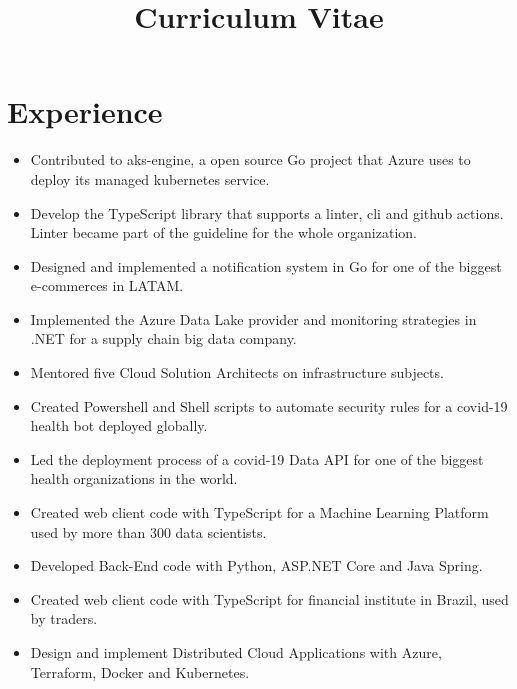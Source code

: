 \documentclass[10pt, a4paper, roman]{moderncv} %
\title{Curriculum Vitae}
\begin{document}
\makecvtitle %

\section{Experience}
{
    \begin{itemize}
	    \item Contributed to aks-engine, a open source Go project that Azure uses to deploy its managed kubernetes service. 
	    \item Develop the TypeScript library that supports a linter, cli and github actions. Linter became part of the guideline for the whole organization.
        \item Designed and implemented a notification system in Go for one of the biggest e-commerces in LATAM.
        \item Implemented the Azure Data Lake provider and monitoring strategies in .NET for a supply chain big data company.
        \item Mentored five Cloud Solution Architects on infrastructure subjects.
        \item Created Powershell and Shell scripts to automate security rules for a covid-19 health bot deployed globally.
        \item Led the deployment process of a covid-19 Data API for one of the biggest health organizations in the world.
    \end{itemize}
}


{
    \begin{itemize}
        \item Created web client code with TypeScript for a Machine Learning Platform used by more than 300 data scientists.
        \item Developed Back-End code with Python, ASP.NET Core and Java Spring.
	    \item Created web client code with TypeScript for financial institute in Brazil, used by traders.
	    \item Design and implement Distributed Cloud Applications with Azure, Terraform, Docker and Kubernetes.
    \end{itemize}
}
\end{document}
